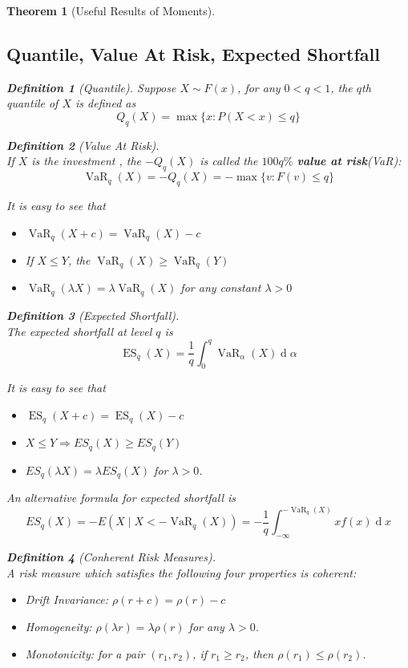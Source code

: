 \documentclass[12pt]{article}
\newtheorem{definition}{Definition}[section]
\newtheorem{theorem}{Theorem}[section]
\theoremstyle{definition}
\DeclareMathOperator{\diff}{d}
\DeclareMathOperator{\VaR}{VaR}
\DeclareMathOperator{\ES}{ES}
\begin{document}
\begin{theorem}[Useful Results of Moments]
\subsection{Quantile, Value At Risk, Expected Shortfall}
\begin{definition}[Quantile]
Suppose $X\sim F(x)$, for any $0<q<1$, the $q$th quantile of $X$ is defined as
\[
Q_q(X)=\max\{x:P(X<x)\leq q\}
\]
\end{definition}
\begin{definition}[Value At Risk]
\hfill\\\normalfont If $X$ is the investment , the $-Q_q(X)$ is called the $100q\%$ \textbf{value at risk}(VaR):
\[
\VaR_q(X)=-Q_q(X)=-\max\{v:F(v)\leq q\}
\]
\end{definition}
It is easy to see that
\begin{itemize}
  \item $\VaR_q(X+c)=\VaR_q(X)-c$
  \item If $X\leq Y$, the $\VaR_q(X)\geq \VaR_q(Y)$
  \item $\VaR_q(\lambda X)=\lambda \VaR_q(X)$ for any constant $\lambda > 0$
\end{itemize}
\begin{definition}[Expected Shortfall]
\hfill\\\normalfont The expected shortfall at level $q$ is
\[
\ES_q(X)=\frac{1}{q}\int_0^q\VaR_\alpha(X)\diff \alpha
\]
\end{definition}
It is easy to see that
\begin{itemize}
  \item $\ES_q(X+c)=\ES_q(X)-c$
  \item $X\leq Y\Rightarrow ES_q(X)\geq ES_q(Y)$
  \item $ES_q(\lambda X)=\lambda ES_q(X)$ for $\lambda>0$.
\end{itemize}
An alternative formula for expected shortfall is
\[
ES_q(X)=-E(X\mid X<-\VaR_q(X))=-\frac{1}{q}\int_{-\infty}^{-\VaR_q(X)}xf(x)\diff x
\]
\begin{definition}[Conherent Risk Measures]
\hfill\\\normalfont A risk measure which satisfies the following four properties is coherent:
\begin{itemize}
  \item Drift Invariance: $\rho(r+c)=\rho(r)-c$
  \item Homogeneity: $\rho(\lambda r)=\lambda\rho(r)$ for any $\lambda>0$.
  \item Monotonicity: for a pair $(r_1, r_2)$, if $r_1\geq r_2$, then $\rho(r_1)\leq \rho(r_2)$.

\end{itemize}
\end{definition}
\end{theorem}
\end{document}
